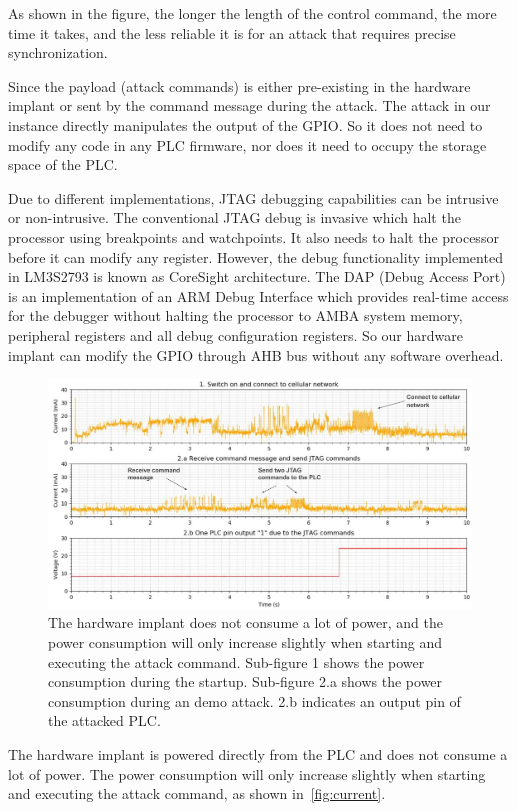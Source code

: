 As shown in the figure, the longer the length of the control command, the more time it takes, and the less reliable it is for an attack that requires precise synchronization.

Since the payload (attack commands) is either pre-existing in the hardware implant or sent by the command message during the attack. The attack in our instance directly manipulates the output of the GPIO. So it does not need to modify any code in any PLC firmware, nor does it need to occupy the storage space of the PLC.

Due to different implementations, JTAG debugging capabilities can be intrusive or non-intrusive. The conventional JTAG debug is invasive which halt the processor using breakpoints and watchpoints. It also needs to halt the processor before it can modify any register. However, the debug functionality implemented in LM3S2793 is known as CoreSight architecture. The DAP (Debug Access Port) is an implementation of an ARM Debug Interface which provides real-time access for the debugger without halting the processor to AMBA system memory, peripheral registers and all debug configuration registers. So our hardware implant can modify the GPIO through AHB bus without any software overhead.

\begin{figure}[h]
	\includegraphics[width=\textwidth]{figures/current}
	\centering
	\caption{The hardware implant does not consume a lot of power, and the power consumption will only increase slightly when starting and executing the attack command. Sub-figure 1 shows the power consumption during the startup. Sub-figure 2.a shows the power consumption during an demo attack. 2.b indicates an output pin of the attacked PLC. }
	\label{fig:current}
\end{figure}

The hardware implant is powered directly from the PLC and does not consume a lot of power. The power consumption will only increase slightly when starting and executing the attack command, as shown in~\autoref{fig:current}.



